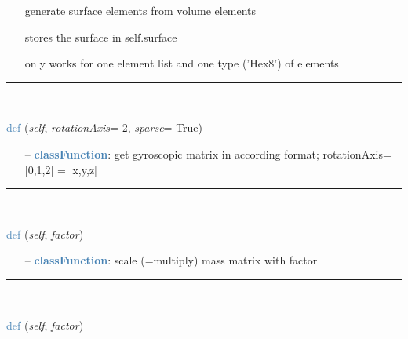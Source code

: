 \begin{itemize}[leftmargin=1.4cm]
\begin{itemize}[leftmargin=0.5cm]
\begin{itemize}[leftmargin=1.4cm]
\begin{itemize}[leftmargin=1.4cm]
\begin{itemize}[leftmargin=0.5cm]
\begin{itemize}[leftmargin=0.7cm]
\begin{itemize}[leftmargin=1.2cm]
\setlength{\itemindent}{-0.7cm}
    \item[] generate surface elements from volume elements
    \item[] stores the surface in self.surface
    \item[] only works for one element list and one type ('Hex8') of elements
  \end{itemize}
\vspace{12pt}\end{itemize}
%
\noindent\rule{8cm}{0.75pt}\vspace{1pt} \\ 
\begin{flushleft}
\noindent \textcolor{steelblue}{def {\bf {}}}\label{sec:FEM:FEMinterface:GetGyroscopicMatrix}
({\it self}, {\it rotationAxis}= 2, {\it sparse}= True)
\end{flushleft}
\setlength{\itemindent}{0.7cm}
\begin{itemize}[leftmargin=0.7cm]
  \item[--]  \textcolor{steelblue}{\bf classFunction}: get gyroscopic matrix in according format; rotationAxis=[0,1,2] = [x,y,z]\vspace{12pt}\end{itemize}
%
\noindent\rule{8cm}{0.75pt}\vspace{1pt} \\ 
\begin{flushleft}
\noindent \textcolor{steelblue}{def {\bf {}}}\label{sec:FEM:FEMinterface:ScaleMassMatrix}
({\it self}, {\it factor})
\end{flushleft}
\setlength{\itemindent}{0.7cm}
\begin{itemize}[leftmargin=0.7cm]
  \item[--]  \textcolor{steelblue}{\bf classFunction}: scale (=multiply) mass matrix with factor\vspace{12pt}\end{itemize}
%
\noindent\rule{8cm}{0.75pt}\vspace{1pt} \\ 
\begin{flushleft}
\noindent \textcolor{steelblue}{def {\bf {}}}\label{sec:FEM:FEMinterface:ScaleStiffnessMatrix}
({\it self}, {\it factor})

\end{flushleft}
\end{itemize}
\end{itemize}
\end{itemize}
\end{itemize}
\end{itemize}
